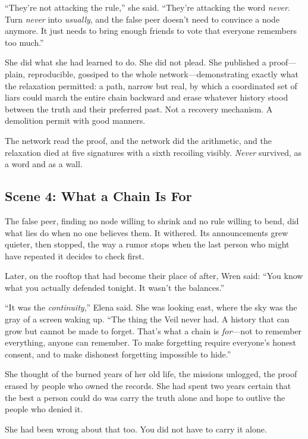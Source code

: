 \documentclass[12pt,letterpaper]{book}
\begin{document}
``They're not attacking the rule,'' she said. ``They're attacking the word
\emph{never}. Turn \emph{never} into \emph{usually}, and the false peer doesn't
need to convince a node anymore. It just needs to bring enough friends to vote
that everyone remembers too much.''

She did what she had learned to do. She did not plead. She published a
proof---plain, reproducible, gossiped to the whole network---demonstrating
exactly what the relaxation permitted: a path, narrow but real, by which a
coordinated set of liars could march the entire chain backward and erase whatever
history stood between the truth and their preferred past. Not a recovery
mechanism. A demolition permit with good manners.

The network read the proof, and the network did the arithmetic, and the
relaxation died at five signatures with a sixth recoiling visibly. \emph{Never}
survived, as a word and as a wall.

\hypertarget{scene-4-what-a-chain-is-for}{%
\subsection{Scene 4: What a Chain Is
For}\label{scene-4-what-a-chain-is-for}}

The false peer, finding no node willing to shrink and no rule willing to bend, did
what lies do when no one believes them. It withered. Its announcements grew
quieter, then stopped, the way a rumor stops when the last person who might have
repeated it decides to check first.

Later, on the rooftop that had become their place of after, Wren said: ``You know
what you actually defended tonight. It wasn't the balances.''

``It was the \emph{continuity},'' Elena said. She was looking east, where the sky
was the gray of a screen waking up. ``The thing the Veil never had. A history that
can grow but cannot be made to forget. That's what a chain is \emph{for}---not to
remember everything, anyone can remember. To make forgetting require everyone's
honest consent, and to make dishonest forgetting impossible to hide.''

She thought of the burned years of her old life, the missions unlogged, the proof
erased by people who owned the records. She had spent two years certain that the
best a person could do was carry the truth alone and hope to outlive the people
who denied it.

She had been wrong about that too. You did not have to carry it alone.
\end{document}
